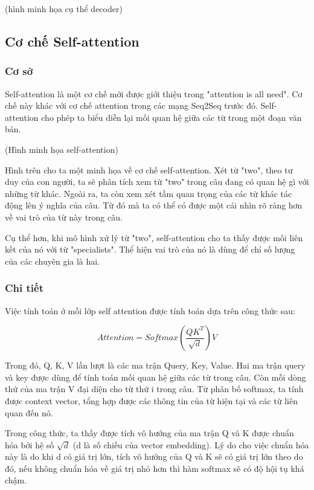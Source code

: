 (hình minh họa cụ thể decoder)

\subsection{Cơ chế Self-attention}

\subsubsection{Cơ sở}
Self-attention là một cơ chế mới được giới thiệu trong "attention is all need". Cơ chế này khác với cơ chế attention trong các mạng Seq2Seq trước đó. Self-attention cho phép ta biểu diễn lại mối quan hệ giữa các từ trong một đoạn văn bản.

(Hình minh họa self-attention)

Hình trên cho ta một minh họa về cơ chế self-attention. Xét từ "two", theo tư duy của con người, ta sẽ phân tích xem từ "two" trong câu đang có quan hệ gì với những từ khác. Ngoài ra, ta còn xem xét tầm quan trọng của các từ khác tác động lên ý nghĩa của câu. Từ đó mà ta có thể có được một cái nhìn rõ ràng hơn về vai trò của từ này trong câu.

Cụ thể hơn, khi mô hình xử lý từ "two", self-attention cho ta thấy được mối liên kết của nó với từ "specialists". Thể hiện vai trò của nó là dùng để chỉ số lượng của các chuyên gia là hai.

\subsubsection{Chi tiết}
Việc tính toán ở mỗi lớp self attention được tính toán dựa trên công thức sau:

\begin{equation*}
	Attention = Softmax(\frac{QK^T}{\sqrt{d}})V
\end{equation*}

Trong đó, Q, K, V lần lượt là các ma trận Query, Key, Value. Hai ma trận query và key được dùng để tính toán mối quan hệ giữa các từ trong câu. Còn mỗi dòng thứ của ma trận V đại diện cho từ thứ i trong câu. Từ phân bố softmax, ta tính được context vector, tổng hợp được các thông tin của từ hiện tại và các từ liên quan đến nó. 

Trong công thức, ta thấy được tích vô hướng của ma trận Q và K được chuẩn hóa bởi hệ số $\sqrt{d}$ (d là số chiều của vector embedding). Lý do cho việc chuẩn hóa này là do khi d có giá trị lớn, tích vô hướng của Q và K sẽ có giá trị lớn theo do đó, nếu không chuẩn hóa về giá trị nhỏ hơn thì hàm softmax sẽ có độ hội tụ khá chậm.

